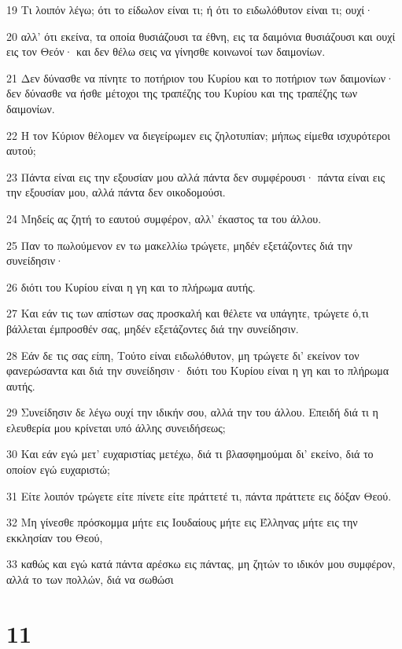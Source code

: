 \par 19 Τι λοιπόν λέγω; ότι το είδωλον είναι τι; ή ότι το ειδωλόθυτον είναι τι; ουχί·
\par 20 αλλ' ότι εκείνα, τα οποία θυσιάζουσι τα έθνη, εις τα δαιμόνια θυσιάζουσι και ουχί εις τον Θεόν· και δεν θέλω σεις να γίνησθε κοινωνοί των δαιμονίων.
\par 21 Δεν δύνασθε να πίνητε το ποτήριον του Κυρίου και το ποτήριον των δαιμονίων· δεν δύνασθε να ήσθε μέτοχοι της τραπέζης του Κυρίου και της τραπέζης των δαιμονίων.
\par 22 Η τον Κύριον θέλομεν να διεγείρωμεν εις ζηλοτυπίαν; μήπως είμεθα ισχυρότεροι αυτού;
\par 23 Πάντα είναι εις την εξουσίαν μου αλλά πάντα δεν συμφέρουσι· πάντα είναι εις την εξουσίαν μου, αλλά πάντα δεν οικοδομούσι.
\par 24 Μηδείς ας ζητή το εαυτού συμφέρον, αλλ' έκαστος τα του άλλου.
\par 25 Παν το πωλούμενον εν τω μακελλίω τρώγετε, μηδέν εξετάζοντες διά την συνείδησιν·
\par 26 διότι του Κυρίου είναι η γη και το πλήρωμα αυτής.
\par 27 Και εάν τις των απίστων σας προσκαλή και θέλετε να υπάγητε, τρώγετε ό,τι βάλλεται έμπροσθέν σας, μηδέν εξετάζοντες διά την συνείδησιν.
\par 28 Εάν δε τις σας είπη, Τούτο είναι ειδωλόθυτον, μη τρώγετε δι' εκείνον τον φανερώσαντα και διά την συνείδησιν· διότι του Κυρίου είναι η γη και το πλήρωμα αυτής.
\par 29 Συνείδησιν δε λέγω ουχί την ιδικήν σου, αλλά την του άλλου. Επειδή διά τι η ελευθερία μου κρίνεται υπό άλλης συνειδήσεως;
\par 30 Και εάν εγώ μετ' ευχαριστίας μετέχω, διά τι βλασφημούμαι δι' εκείνο, διά το οποίον εγώ ευχαριστώ;
\par 31 Είτε λοιπόν τρώγετε είτε πίνετε είτε πράττετέ τι, πάντα πράττετε εις δόξαν Θεού.
\par 32 Μη γίνεσθε πρόσκομμα μήτε εις Ιουδαίους μήτε εις Έλληνας μήτε εις την εκκλησίαν του Θεού,
\par 33 καθώς και εγώ κατά πάντα αρέσκω εις πάντας, μη ζητών το ιδικόν μου συμφέρον, αλλά το των πολλών, διά να σωθώσι

\chapter{11}


